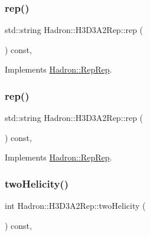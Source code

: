 \subsubsection{\texorpdfstring{rep()}{rep()}\hspace{0.1cm}{\footnotesize\ttfamily [2/3]}}
{\footnotesize\ttfamily std\+::string Hadron\+::\+H3\+D3\+A2\+Rep\+::rep (\begin{DoxyParamCaption}{ }\end{DoxyParamCaption}) const\hspace{0.3cm}{\ttfamily [inline]}, {\ttfamily [virtual]}}



Implements \mbox{\hyperlink{structHadron_1_1RepRep_ab3213025f6de249f7095892109575fde}{Hadron\+::\+Rep\+Rep}}.

\mbox{\label{structHadron_1_1H3D3A2Rep_a2634fb1518fc2bc1d80d435e4e83aff3}} 
\subsubsection{\texorpdfstring{rep()}{rep()}\hspace{0.1cm}{\footnotesize\ttfamily [3/3]}}
{\footnotesize\ttfamily std\+::string Hadron\+::\+H3\+D3\+A2\+Rep\+::rep (\begin{DoxyParamCaption}{ }\end{DoxyParamCaption}) const\hspace{0.3cm}{\ttfamily [inline]}, {\ttfamily [virtual]}}



Implements \mbox{\hyperlink{structHadron_1_1RepRep_ab3213025f6de249f7095892109575fde}{Hadron\+::\+Rep\+Rep}}.

\mbox{\label{structHadron_1_1H3D3A2Rep_a9a02375c619de009aa21e02062e23dac}} 
\subsubsection{\texorpdfstring{twoHelicity()}{twoHelicity()}\hspace{0.1cm}{\footnotesize\ttfamily [1/2]}}
{\footnotesize\ttfamily int Hadron\+::\+H3\+D3\+A2\+Rep\+::two\+Helicity (\begin{DoxyParamCaption}{ }\end{DoxyParamCaption}) const\hspace{0.3cm}{\ttfamily [inline]}, {\ttfamily [virtual]}}


